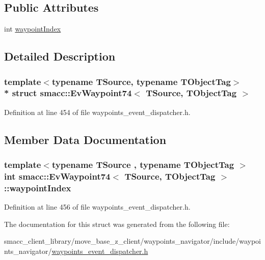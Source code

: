 \subsection*{Public Attributes}
\begin{DoxyCompactItemize}
\item 
int \hyperlink{structsmacc_1_1EvWaypoint74_a66a391adcb4c8896a7456fffb36ec548}{waypoint\+Index}
\end{DoxyCompactItemize}


\subsection{Detailed Description}
\subsubsection*{template$<$typename T\+Source, typename T\+Object\+Tag$>$\\*
struct smacc\+::\+Ev\+Waypoint74$<$ T\+Source, T\+Object\+Tag $>$}



Definition at line 454 of file waypoints\+\_\+event\+\_\+dispatcher.\+h.



\subsection{Member Data Documentation}
\subsubsection[{\texorpdfstring{waypoint\+Index}{waypointIndex}}]{\setlength{\rightskip}{0pt plus 5cm}template$<$typename T\+Source , typename T\+Object\+Tag $>$ int {\bf smacc\+::\+Ev\+Waypoint74}$<$ T\+Source, T\+Object\+Tag $>$\+::waypoint\+Index}\hypertarget{structsmacc_1_1EvWaypoint74_a66a391adcb4c8896a7456fffb36ec548}{}\label{structsmacc_1_1EvWaypoint74_a66a391adcb4c8896a7456fffb36ec548}


Definition at line 456 of file waypoints\+\_\+event\+\_\+dispatcher.\+h.



The documentation for this struct was generated from the following file\+:\begin{DoxyCompactItemize}
\item 
smacc\+\_\+client\+\_\+library/move\+\_\+base\+\_\+z\+\_\+client/waypoints\+\_\+navigator/include/waypoints\+\_\+navigator/\hyperlink{waypoints__event__dispatcher_8h}{waypoints\+\_\+event\+\_\+dispatcher.\+h}\end{DoxyCompactItemize}
